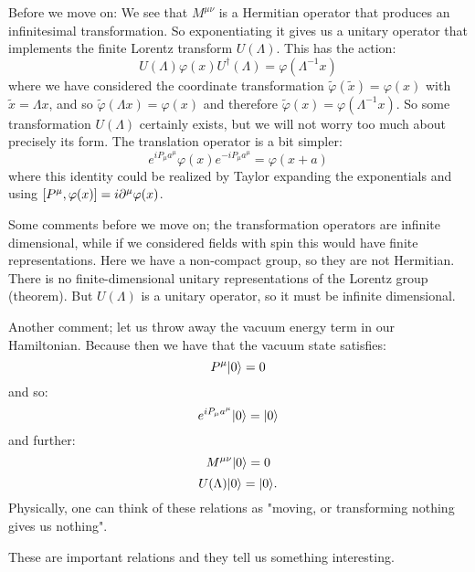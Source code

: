 Before we move on: We see that $M^{\mu\nu}$ is a Hermitian operator that produces an infinitesimal transformation. So exponentiating it gives us a unitary operator that implements the finite Lorentz transform $U(\Lambda)$. This has the action:
\begin{equation}
    U(\Lambda)\varphi(x) U^\dag (\Lambda) =  \varphi(\Lambda^{-1}x)
\end{equation}
where we have considered the coordinate transformation $\tilde{\varphi}(\tilde{x}) = \varphi(x)$ with $\tilde{x} = \Lambda x$, and so $\tilde{\varphi}(\Lambda x) = \varphi(x)$ and therefore $\tilde{\varphi}(x) = \varphi(\Lambda^{-1}x)$. So some transformation $U(\Lambda)$ certainly exists, but we will not worry too much about precisely its form. The translation operator is a bit simpler:
\begin{equation}
    e^{iP_\mu a^\mu}\varphi(x) e^{-iP_\mu a^\mu} = \varphi(x + a)
\end{equation}
where this identity could be realized by Taylor expanding the exponentials and using $[P^\mu, \varphi(x)] = i\p^\mu \varphi(x)$.

Some comments before we move on; the transformation operators are infinite dimensional, while if we considered fields with spin this would have finite representations. Here we have a non-compact group, so they are not Hermitian. There is no finite-dimensional unitary representations of the Lorentz group (theorem). But $U(\Lambda)$ is a unitary operator, so it must be infinite dimensional.

Another comment; let us throw away the vacuum energy term in our Hamiltonian. Because then we have that the vacuum state satisfies:
\begin{equation}
    P^\mu \lvert 0 \rangle = 0
\end{equation}
and so:
\begin{equation}
   e^{iP_\mu a^\mu}\lvert 0 \rangle = \lvert 0 \rangle
\end{equation}
and further:
\begin{equation}
    M^{\mu\nu}\lvert 0 \rangle = 0
\end{equation}
\begin{equation}
    U(\Lambda)\lvert 0 \rangle = \lvert 0 \rangle.
\end{equation}
Physically, one can think of these relations as "moving, or transforming nothing gives us nothing". 

These are important relations and they tell us something interesting. 

